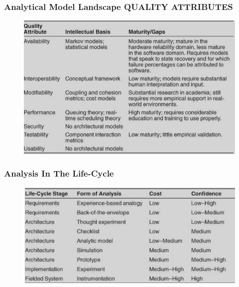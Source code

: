 \documentclass[a4paper]{article}
\begin{document}
\subsubsection{Analytical Model Landscape QUALITY ATTRIBUTES}
\begin{figure}[H]
  \hskip-2.0cm\includegraphics[scale=0.7]{images/analytical-model-landscape.png}
\end{figure}

\subsubsection{Analysis In The Life-Cycle}
\begin{figure}[H]
  \hskip-2.0cm\includegraphics[scale=0.7]{images/types-analysis.png}
\end{figure}
\end{document}
